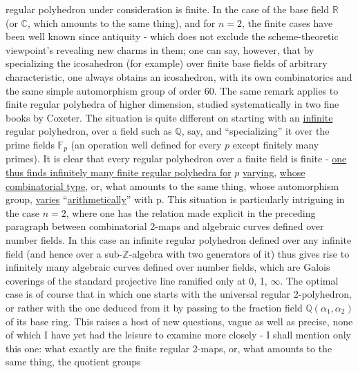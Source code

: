 
regular polyhedron under consideration is finite. In the case of the
base field $\mathbb{R}$ (or $\mathbb{C}$, which amounts to the same thing), and for $n = 2$, the finite
cases have been well known since antiquity - which does not exclude
the scheme-theoretic viewpoint's revealing new charms
in them; one can say, however, that by specializing the icosahedron
(for example) over finite base fields of arbitrary
characteristic, one always obtains an icosahedron, with its own
combinatorics and the same simple automorphism group of order 60.
The same remark applies to finite regular polyhedra
of higher dimension, studied systematically in two
fine books by Coxeter. The situation is quite different on starting
with an \uline{infinite} regular polyhedron, over a field such as $\mathbb{Q}$, say,
and ``specializing'' it over the prime fields $\mathbb{F}_p$ (an operation
well defined for every $p$ except finitely many primes).
It is clear that every regular polyhedron over a finite field is finite -
\uline{one thus finds infinitely many finite regular polyhedra for} $p$
\uline{varying}, \uline{whose combinatorial type}, or, what amounts to the same thing,
whose automorphism group, \uline{varies} ``\uline{arithmetically}'' with p.
This situation is particularly intriguing in the case
$n = 2$, where one has the relation made explicit in the preceding
paragraph between combinatorial 2-maps and algebraic curves
defined over number fields. In this case an infinite regular
polyhedron defined over any infinite field (and hence
over a sub-$\mathbb{Z}$-algebra with two generators of it)
thus gives rise to infinitely many algebraic curves defined over
number fields, which are Galois coverings of the standard projective
line ramified only at 0, 1, $\infty$. The optimal case is of course
that in which one starts with the universal regular 2-polyhedron,
or rather with the one deduced from it by passing to the fraction
field $\mathbb{Q}(\alpha_1,\alpha_2)$ of its base ring. This raises a host of
new questions, vague as well as precise, none of which
I have yet had the leisure to examine more closely - I shall
mention only this one: what exactly are the finite regular
2-maps, or, what amounts to the same thing, the quotient groups



